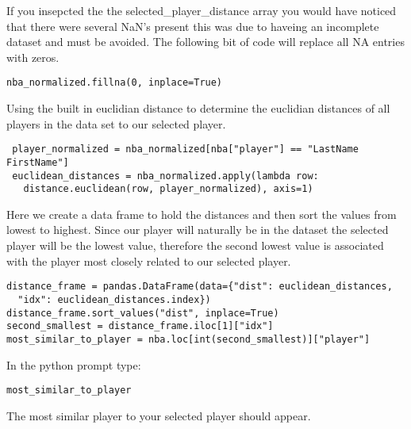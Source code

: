 If you insepcted the the selected\_player\_distance array you would have
noticed that there were several NaN's present this was due to haveing
an incomplete dataset and must be avoided. The following bit of code
will replace all NA entries with zeros. 

 \begin{lstlisting}
nba_normalized.fillna(0, inplace=True)
\end{lstlisting} 

Using the built in euclidian distance to determine the euclidian
distances of all players in the data set to our selected player.

 \begin{lstlisting}
 player_normalized = nba_normalized[nba["player"] == "LastName FirstName"]
 euclidean_distances = nba_normalized.apply(lambda row:
   distance.euclidean(row, player_normalized), axis=1)
\end{lstlisting} 

Here we create a data frame to hold the distances and then sort the
values from lowest to highest. Since our player will naturally be in
the dataset the selected player will be the lowest value, therefore
the second lowest value is associated with the player most closely
related to our selected player.

\begin{lstlisting}
distance_frame = pandas.DataFrame(data={"dist": euclidean_distances,
  "idx": euclidean_distances.index})
distance_frame.sort_values("dist", inplace=True)
second_smallest = distance_frame.iloc[1]["idx"]
most_similar_to_player = nba.loc[int(second_smallest)]["player"]
\end{lstlisting} 

In the python prompt type: 

\begin{lstlisting}
most_similar_to_player 
\end{lstlisting} 

The most similar player to your selected player should appear. 

